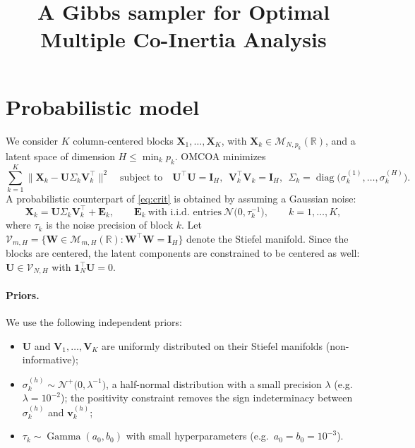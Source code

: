 \documentclass[11pt]{article}
\title{A Gibbs sampler for Optimal Multiple Co-Inertia Analysis}
\date{}
\DeclareMathOperator{\diag}{diag}
\DeclareMathOperator{\Ga}{Gamma}
\newcommand{\X}{\mathbf{X}}
\newcommand{\U}{\mathbf{U}}
\newcommand{\V}{\mathbf{V}}
\newcommand{\EE}{\mathbf{E}}
\newcommand{\W}{\mathbf{W}}
\newcommand{\vv}{\mathbf{v}}
\newcommand{\I}{\mathbf{I}}
\newcommand{\one}{\mathbf{1}}
\newcommand{\Stiefel}[2]{\mathcal V_{#1,#2}}
\begin{document}
\maketitle

\section{Probabilistic model}

We consider $K$ column-centered blocks $\X_1,\ldots,\X_K$, with $\X_k\in\mathcal M_{N,p_k}(\mathbb R)$, and a
latent space of dimension $H\leq\min_k p_k$. OMCOA minimizes
\begin{equation}
  \sum_{k=1}^K\bigl\|\X_k-\U\Sigma_k\V_k^\intercal\bigr\|^2
  \quad\text{subject to}\quad \U^\intercal\U=\I_H,\ \ \V_k^\intercal\V_k=\I_H,\ \ \Sigma_k=\diag\bigl(\sigma_k^{(1)},\ldots,\sigma_k^{(H)}\bigr).
  \label{eq:crit}
\end{equation}
A probabilistic counterpart of \eqref{eq:crit} is obtained by assuming a Gaussian noise:
\begin{equation}
  \X_k=\U\Sigma_k\V_k^\intercal+\EE_k,\qquad
  \EE_k\ \text{with i.i.d.\ entries}\ \mathcal N\bigl(0,\tau_k^{-1}\bigr),\qquad k=1,\ldots,K,
  \label{eq:model}
\end{equation}
where $\tau_k$ is the noise precision of block $k$. Let $\Stiefel{m}{H}=\{\W\in\mathcal M_{m,H}(\mathbb R):\W^\intercal\W=\I_H\}$
denote the Stiefel manifold. Since the blocks are centered, the latent components are constrained to be
centered as well: $\U\in\Stiefel{N}{H}$ with $\one_N^\intercal\U=0$.

\paragraph{Priors.} We use the following independent priors:
\begin{itemize}
  \item $\U$ and $\V_1,\ldots,\V_K$ are uniformly distributed on their Stiefel manifolds (non-informative);
  \item $\sigma_k^{(h)}\sim\mathcal N^+\bigl(0,\lambda^{-1}\bigr)$, a half-normal distribution with a small precision
        $\lambda$ (e.g.\ $\lambda=10^{-2}$); the positivity constraint removes the sign indeterminacy between
        $\sigma_k^{(h)}$ and $\vv_k^{(h)}$;
  \item $\tau_k\sim\Ga(a_0,b_0)$ with small hyperparameters (e.g.\ $a_0=b_0=10^{-3}$).
\end{itemize}
\end{document}
